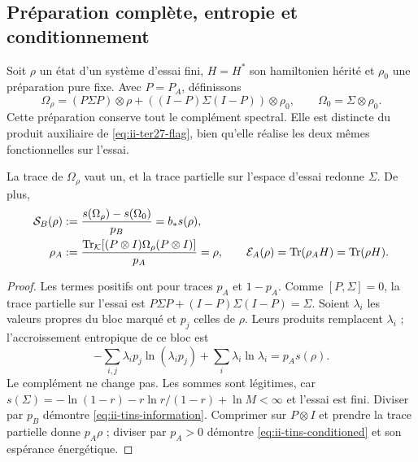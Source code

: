 \subsection{Préparation complète, entropie et conditionnement}
\label{subsec:ii-tins-condicionamiento}

Soit $\rho$ un état d’un système d’essai fini, $H=H^*$ son hamiltonien
hérité et $\rho_0$ une préparation pure fixe. Avec $P=P_A$, définissons
\begin{equation}
 \Omega_\rho=(P\Sigma P)\otimes\rho
 +((I-P)\Sigma(I-P))\otimes\rho_0,
 \qquad \Omega_0=\Sigma\otimes\rho_0.
 \label{eq:ii-tins-preparation}
\end{equation}
Cette préparation conserve tout le complément spectral. Elle est distincte du
produit auxiliaire de \eqref{eq:ii-ter27-flag}, bien qu’elle réalise les deux mêmes
fonctionnelles sur l’essai.

\begin{theorem}
\label{thm:ii-tins-readings}
La trace de $\Omega_\rho$ vaut un, et la trace partielle sur l’espace
d’essai redonne $\Sigma$. De plus,
\begin{align}
 \mathcal S_B(\rho)&:=
 \frac{s(\Omega_\rho)-s(\Omega_0)}{p_B}=b_*s(\rho),
 \label{eq:ii-tins-information}\\
 \rho_A&:=\frac{\operatorname{Tr}_{\mathcal K}[(P\otimes I)\Omega_\rho(P\otimes I)]}{p_A}
 =\rho,\qquad
 \mathcal E_A(\rho)=\operatorname{Tr}(\rho_AH)=\operatorname{Tr}(\rho H).
 \label{eq:ii-tins-conditioned}
\end{align}
\end{theorem}
\begin{proof}
Les termes positifs ont pour traces $p_A$ et $1-p_A$. Comme $[P,\Sigma]=0$,
la trace partielle sur l’essai est
$P\Sigma P+(I-P)\Sigma(I-P)=\Sigma$. Soient $\lambda_i$ les valeurs propres
du bloc marqué et $p_j$ celles de $\rho$. Leurs produits remplacent
$\lambda_i$ ; l’accroissement entropique de ce bloc est
\[
 -\sum_{i,j}\lambda_ip_j\ln(\lambda_ip_j)
 +\sum_i\lambda_i\ln\lambda_i=p_As(\rho).
\]
Le complément ne change pas. Les sommes sont légitimes, car
$s(\Sigma)=-\ln(1-r)-r\ln r/(1-r)+\ln M<\infty$ et l’essai est fini.
Diviser par $p_B$ démontre \eqref{eq:ii-tins-information}. Comprimer sur
$P\otimes I$ et prendre la trace partielle donne $p_A\rho$ ; diviser par $p_A>0$
démontre \eqref{eq:ii-tins-conditioned} et son espérance énergétique.
\end{proof}

